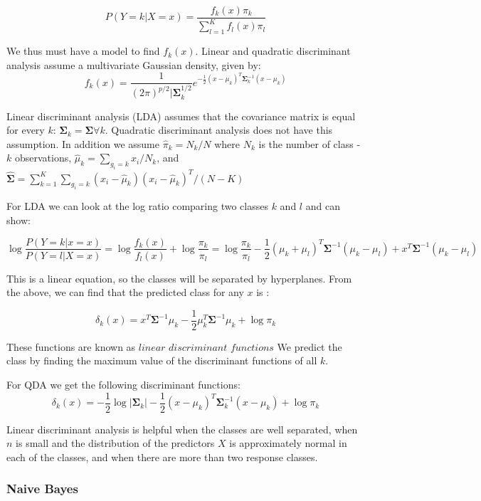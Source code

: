 \documentclass[12pt,twoside]{reedthesis}
\theoremstyle{definition}
\theoremstyle{definition}
\theoremstyle{definition}
\theoremstyle{remark}
\begin{document}
\[ P(Y = k | X = x) = \frac{f_k(x)\pi_k}{\sum_{l = 1}^Kf_l(x)\pi_l}\]

We thus must have a model to find \(f_k(x)\). Linear and quadratic
discriminant analysis assume a multivariate Gaussian density, given by:
\[f_k(x) = \frac{1}{(2\pi)^{p/2}|\mathbf{\Sigma}_k^{1/2}}e^{-\frac{1}{2}(x-\mu_k)^T\mathbf{\Sigma}_k^{-1}(x - \mu_k)}\]

Linear discriminant analysis (LDA) assumes that the covariance matrix is
equal for every \(k\):
\(\mathbf{\Sigma}_k = \mathbf{\Sigma} \forall k\). Quadratic
discriminant analysis does not have this assumption. In addition we
assume \(\hat{\pi}_k = N_k/N\) where \(N_k\) is the number of class -
\(k\) observations, \(\hat{\mu}_k = \sum_{g_i = k}x_i/N_k\), and
\(\mathbf{\hat{\Sigma}} = \sum_{k = 1}^{K}\sum_{g_i = k}(x_i - \hat \mu_k)(x_i - \hat\mu_k)^T / (N- K)\)

For LDA we can look at the log ratio comparing two classes \(k\) and
\(l\) and can show:

\[\log\frac{P(Y= k|x = x)}{P(Y = l|X = x)} = \log\frac{f_k(x)}{f_l(x)} + \log\frac{\pi_k}{\pi_l} = \log \frac{\pi_k}{\pi_l} - \frac{1}{2}(\mu_k + \mu_l)^T\mathbf{\Sigma}^{-1}(\mu_k- \mu_l) + x^T\mathbf{\Sigma}^{-1}(\mu_k - \mu_l) \]

This is a linear equation, so the classes will be separated by
hyperplanes. From the above, we can find that the predicted class for
any \(x\) is :

\[ \delta_k(x) = x^T\mathbf{\Sigma}^{-1}\mu_k - \frac{1}{2}\mu_k^T\mathbf{\Sigma}^{-1}\mu_k + \log \pi_k \]

These functions are known as \(\textit{linear discriminant functions}\)
We predict the class by finding the maximum value of the discriminant
functions of all \(k\).

For QDA we get the following discriminant functions:
\[ \delta_k(x) = -\frac{1}{2}\log|\mathbf{\Sigma}_k| - \frac{1}{2}(x - \mu_k)^T\mathbf{\Sigma}_k^{-1}(x - \mu_k) + \log \pi_k \]

Linear discriminant analysis is helpful when the classes are well
separated, when \(n\) is small and the distribution of the predictors
\(X\) is approximately normal in each of the classes, and when there are
more than two response classes.

\subsubsection{Naive Bayes}\label{naive-bayes}
\end{document}
